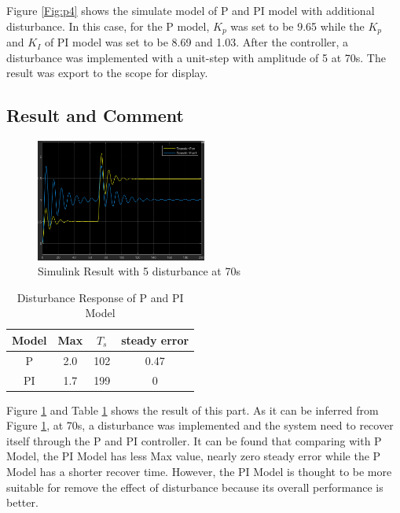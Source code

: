 \documentclass[11pt, a4paper]{article}
\begin{document}
Figure \ref{Fig:p4} shows the simulate model of P and PI model with additional disturbance. In this case, for the P model, $K_{p}$ was set to be 9.65 while the $K_{p}$ and $K_{I}$ of PI model was set to be 8.69 and 1.03. After the controller, a disturbance was implemented with a unit-step with amplitude of 5 at 70s. The result was export to the scope for display.

\subsection{Result and Comment}


\begin{figure}[htbp]     \begin{centering}
    \includegraphics[width=0.5\textwidth]{p4_r.png}
    \caption{\label{Fig:p4_r}Simulink Result with 5 disturbance at 70s}
    \end{centering}
    
\end{figure}


\begin{table}[htbp]
\caption{Disturbance Response of P and PI Model}
\label{tab:resp_4}
\begin{center}
\begin{tabular}{c||ccc}
\hline
Model   &    Max    & $T_{s}$   &  steady error \\
\hline
P  &   2.0   &  102     &  0.47     \\
PI  &   1.7      &  199     &  0     \\
\hline
\end{tabular}
\end{center}
\end{table}

Figure \ref{Fig:p4_r} and Table \ref{tab:resp_4} shows the result of this part. As it can be inferred from Figure \ref{Fig:p4_r}, at 70s, a disturbance was implemented and the system need to recover itself through the P and PI controller. It can be found that comparing with P Model, the PI Model has less Max value, nearly zero steady error while the P Model has a shorter recover time. However, the PI Model is thought to be more suitable for remove the effect of disturbance because its overall performance is better.
\end{document}
